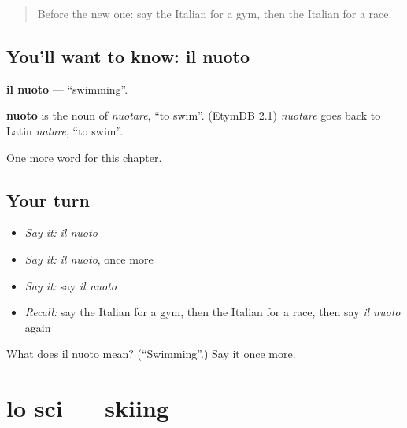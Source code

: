\label{lesson:IT-C202-nuoto}



\begin{quote}
Before the new one: say the Italian for a gym, then the Italian for a race.
\end{quote}

\subsection*{You'll want to know: il nuoto}
\textbf{il nuoto} — \textquotedblleft{}swimming\textquotedblright{}.

\begin{cousinweb}
\textbf{nuoto} is the noun of \emph{nuotare}, \textquotedblleft{}to swim\textquotedblright{}. (EtymDB 2.1) \emph{nuotare} goes back to Latin \emph{natare}, \textquotedblleft{}to swim\textquotedblright{}.
\end{cousinweb}

\begin{grammarlens}[title={What you've built}]
One more word for this chapter.
\end{grammarlens}

\subsection*{Your turn}
\begin{itemize}
\raggedright
  \item \emph{Say it:} \emph{il nuoto}
  \item \emph{Say it:} \emph{il nuoto}, once more
  \item \emph{Say it:} say \emph{il nuoto}
  \item \emph{Recall:} say the Italian for a gym, then the Italian for a race, then say \emph{il nuoto} again
\end{itemize}

\begin{tcolorbox}[breakable,colback=teal!4,colframe=teal!35!black,title={Before you move on}]
What does il nuoto mean? (\textquotedblleft{}Swimming\textquotedblright{}.) Say it once more.
\end{tcolorbox}
\section[lo sci]{lo sci — skiing}

\label{lesson:IT-C202-sci}



